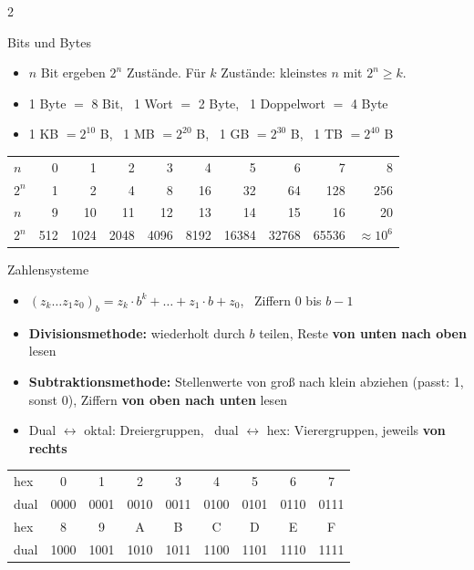 \documentclass[fontsize=10pt,a4paper,DIV=20,headsepline]{scrartcl}
\newenvironment{kl}{\begin{itemize}[leftmargin=3mm, itemsep=0.1mm, topsep=0.3mm, parsep=0pt, label=\textcolor{diagramm}{\textbullet}]}{\end{itemize}}
\begin{document}
\begin{multicols}{2}
\raggedcolumns

\begin{fs}{Bits und Bytes}
\begin{kl}
\item $n$ Bit ergeben $2^n$ Zustände. Für $k$ Zustände: kleinstes $n$ mit $2^n \geq k$.
\item 1 Byte $=$ 8 Bit, \ 1 Wort $=$ 2 Byte, \ 1 Doppelwort $=$ 4 Byte
\item 1 KB $= 2^{10}$ B, \ 1 MB $= 2^{20}$ B, \ 1 GB $= 2^{30}$ B, \ 1 TB $= 2^{40}$ B
\end{kl}
\smallskip
{\scriptsize\setlength{\tabcolsep}{2.2pt}
\begin{tabular}{@{}l|*{9}{r}@{}}
$n$ & 0 & 1 & 2 & 3 & 4 & 5 & 6 & 7 & 8 \\
$2^n$ & 1 & 2 & 4 & 8 & 16 & 32 & 64 & 128 & 256 \\ \hline
$n$ & 9 & 10 & 11 & 12 & 13 & 14 & 15 & 16 & 20 \\
$2^n$ & 512 & 1024 & 2048 & 4096 & 8192 & 16384 & 32768 & 65536 & $\approx 10^6$
\end{tabular}}
\end{fs}

\begin{fs}{Zahlensysteme}
\begin{kl}
\item $(z_k \ldots z_1 z_0)_b = z_k \cdot b^k + \ldots + z_1 \cdot b + z_0$, \ Ziffern $0$ bis $b - 1$
\item \textbf{Divisionsmethode:} wiederholt durch $b$ teilen, Reste \textbf{von unten nach oben} lesen
\item \textbf{Subtraktionsmethode:} Stellenwerte von groß nach klein abziehen (passt: 1, sonst 0), Ziffern \textbf{von oben nach unten} lesen
\item Dual $\leftrightarrow$ oktal: Dreiergruppen, \ dual $\leftrightarrow$ hex: Vierergruppen, jeweils \textbf{von rechts}
\end{kl}
\smallskip
{\scriptsize\setlength{\tabcolsep}{2.4pt}
\begin{tabular}{@{}l|*{8}{c}@{}}
hex & 0 & 1 & 2 & 3 & 4 & 5 & 6 & 7 \\
dual & 0000 & 0001 & 0010 & 0011 & 0100 & 0101 & 0110 & 0111 \\ \hline
hex & 8 & 9 & A & B & C & D & E & F \\
dual & 1000 & 1001 & 1010 & 1011 & 1100 & 1101 & 1110 & 1111
\end{tabular}}
\end{fs}


\end{multicols}
\end{document}
